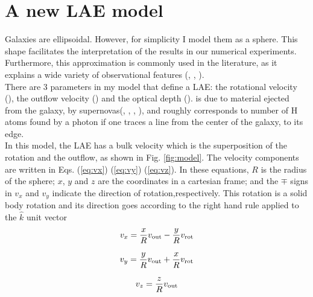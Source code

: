 \setcounter{equation}{0}
\chapter{A new LAE model}
\label{chap:model}


Galaxies are ellipsoidal. However, for simplicity I model them as a sphere. This shape facilitates the interpretation of the results in our numerical experiments. Furthermore, this approximation is commonly used in the literature, as it explains a wide variety of observational features (\cite{Ahn03}, \cite{Verhamme06}, \cite{Dijkstra06}). \\

There are 3 parameters in my model that define a LAE: the rotational velocity (\vrot), the outflow velocity (\vout) and the optical depth (\tauh). \vout is due to material ejected from the galaxy, by supernovas(\cite{Verhamme06}, \cite{Orsi12}, \cite{Hashimoto2015}, \cite{Gronke2015}), and \tauh roughly corresponds to number of H atoms found by a \lya photon if one traces a line from the center of the galaxy, to its edge.\\

In this model, the LAE has a bulk velocity which is the superposition of the rotation and the outflow, as shown in Fig. \ref{fig:model}. The velocity components are written in Eqs. (\ref{eq:vx}) (\ref{eq:vy}) (\ref{eq:vz}). In these equations, $R$ is the radius of the sphere; $x$, $y$ and $z$ are the coordinates in a cartesian frame; and the $\mp$ signs in $v_x$ and $v_y$ indicate the direction of rotation,respectively. This rotation is a solid body rotation and its direction goes according to the right hand rule applied to the $\hat{k}$ unit vector \\

\begin{equation}
v_{x}=\frac{x}{R}v_{\rm out}-\frac{y}{R}v_{\rm rot} 
\label{eq:vx}
\end{equation}

\begin{equation}
v_{y}=\frac{y}{R}v_{\rm out}+\frac{x}{R}v_{\rm rot} 
\label{eq:vy}
\end{equation}

\begin{equation}
v_{z}=\frac{z}{R}v_{\rm out}
\label{eq:vz}
\end{equation}

